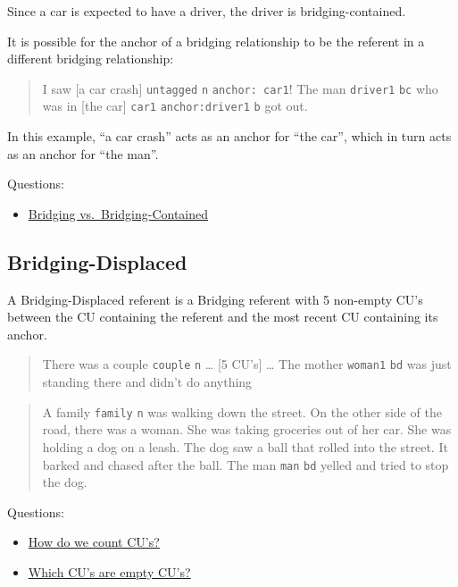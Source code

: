\documentclass[
]{book}
\providecommand{\tightlist}{%
  \setlength{\itemsep}{0pt}\setlength{\parskip}{0pt}}
\begin{document}
Since a car is expected to have a driver,
the driver is bridging-contained.

It is possible for the anchor of a bridging relationship to be the referent in a different bridging relationship:

\begin{quote}
I saw {[}a car crash{]} \texttt{untagged} \texttt{n} \texttt{anchor:\ car1}!
The man \texttt{driver1} \texttt{bc} who was in {[}the car{]} \texttt{car1} \texttt{anchor:driver1} \texttt{b} got out.
\end{quote}

In this example, ``a car crash'' acts as an anchor for ``the car'',
which in turn acts as an anchor for ``the man''.

Questions:

\begin{itemize}
\tightlist
\item
  \protect\hyperlink{bridging-vs.-bridging-contained}{Bridging vs.~Bridging-Contained}
\end{itemize}

\hypertarget{bridging-displaced}{%
\subsection{Bridging-Displaced}\label{bridging-displaced}}

A Bridging-Displaced referent is a Bridging referent with 5 non-empty CU's between the CU containing the referent and the most recent CU containing its anchor.

\begin{quote}
There was a couple \texttt{couple} \texttt{n} \ldots{}
{[}5 CU's{]} \ldots{}
The mother \texttt{woman1} \texttt{bd} was just standing there and didn't do anything
\end{quote}

\begin{quote}
A family \texttt{family} \texttt{n} was walking down the street.
On the other side of the road, there was a woman.
She was taking groceries out of her car.
She was holding a dog on a leash.
The dog saw a ball that rolled into the street.
It barked and chased after the ball.
The man \texttt{man} \texttt{bd} yelled and tried to stop the dog.
\end{quote}

Questions:

\begin{itemize}
\tightlist
\item
  \protect\hyperlink{counting-cus}{How do we count CU's?}
\item
  \protect\hyperlink{empty-cus}{Which CU's are empty CU's?}
\end{itemize}
\end{document}
